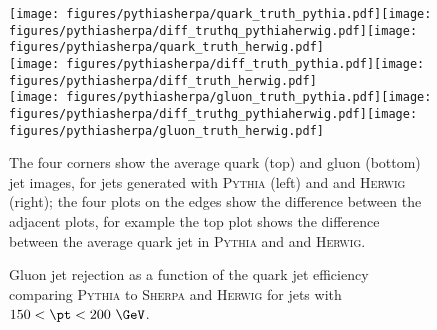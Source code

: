 \begin{figure}[tbp]
\begin{center}
\texttt{[image: figures/pythiasherpa/quark\_truth\_pythia.pdf]}\texttt{[image: figures/pythiasherpa/diff\_truthq\_pythiaherwig.pdf]}\texttt{[image: figures/pythiasherpa/quark\_truth\_herwig.pdf]}\\
\texttt{[image: figures/pythiasherpa/diff\_truth\_pythia.pdf]}\hspace{54mm}\texttt{[image: figures/pythiasherpa/diff\_truth\_herwig.pdf]}\\
\texttt{[image: figures/pythiasherpa/gluon\_truth\_pythia.pdf]}\texttt{[image: figures/pythiasherpa/diff\_truthg\_pythiaherwig.pdf]}\texttt{[image: figures/pythiasherpa/gluon\_truth\_herwig.pdf]}
\caption{
The four corners show the average quark (top) and gluon (bottom) jet images, for jets generated with \textsc{Pythia} (left) and
and \textsc{Herwig} (right); the four plots on the edges show the difference between the adjacent plots,
for example the top plot shows the difference between the average quark jet in \textsc{Pythia} and
and \textsc{Herwig}.}
\label{fig:avg:pythiasherpa}
\end{center}
\end{figure}


\begin{figure}[h!]
\begin{center}
\caption{Gluon jet rejection as a function of the quark jet efficiency comparing \textsc{Pythia} to \protect{} \textsc{Sherpa}
and \protect{} \textsc{Herwig} for jets with $150<\pt<200~\GeV$.}
\label{fig:pythiasherpa}
\end{center}
\end{figure}


